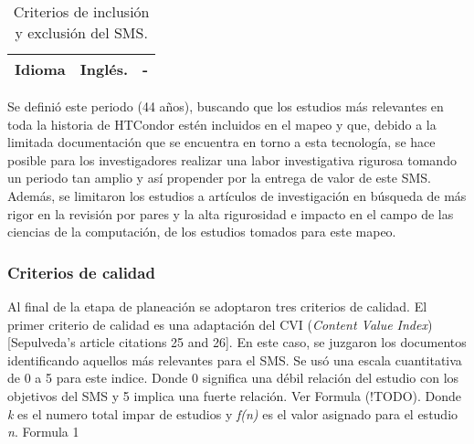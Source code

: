 \begin{table*}[htbp]
\begin{tabularx}{\textwidth}{|>{\arraybackslash}m{2.3cm}|>{\arraybackslash}X|>{\arraybackslash}X|}
		\hline
		Idioma              & Inglés.                                                                                                                                                         & -                                                                                                                                               \\
		\hline
	\end{tabularx}
	\vspace{6pt}  %
	\caption{Criterios de inclusión y exclusión del SMS.}
	\label{table:Criteria}

\end{table*}

Se definió este periodo (44 años), buscando que los estudios más relevantes en toda la historia de HTCondor estén incluidos en el mapeo y que, debido a la limitada documentación que se encuentra en torno a esta tecnología, se hace posible para los investigadores realizar una labor investigativa rigurosa tomando un periodo tan amplio y así propender por la entrega de valor de este SMS. Además, se limitaron los estudios a artículos de investigación en búsqueda de más rigor en la revisión por pares y la alta rigurosidad e impacto en el campo de las ciencias de la computación, de los estudios tomados para este mapeo.

\subsubsection{Criterios de calidad}
Al final de la etapa de planeación se adoptaron tres criterios de calidad.
El primer criterio de calidad es una adaptación del CVI (\textit{Content Value Index}) [Sepulveda's article citations 25 and 26]. En este caso, se juzgaron los documentos identificando aquellos más relevantes para el SMS. Se usó una escala cuantitativa de 0 a 5 para este indice. Donde 0 significa una débil relación del estudio con los objetivos del SMS y 5 implica una fuerte relación. Ver Formula (!TODO). Donde \textit{k} es el numero total impar de estudios y \textit{f(n)} es el valor asignado para el estudio \textit{n}.
Formula 1
